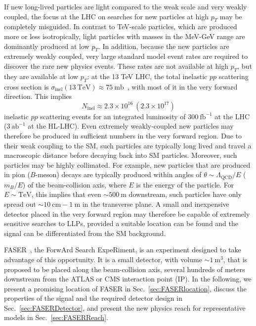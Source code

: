 If new long-lived particles are light compared to the weak scale and very weakly coupled, the focus at the LHC on searches for new particles at high $p_T$ may be completely misguided.  In contrast to TeV-scale particles, which are produced more or less isotropically, light particles with masses in the MeV-GeV range are dominantly produced at low $p_T$.  In addition, because the new particles are extremely weakly coupled, very large standard model event rates are required to discover the rare new physics events.  These rates are not available at high $p_T$, but they are available at low $p_T$: at the 13 TeV LHC, the total inelastic $pp$ scattering cross section is $\sigma_{\text{inel}}(13~\text{TeV}) \approx 75~\text{mb}$~\cite{Aaboud:2016mmw, VanHaevermaet:2016gnh}, with most of it in the very forward direction. This implies
\begin{equation}
N_{\text{inel}} \approx 2.3 \times 10^{16} \ (2.3 \times 10^{17})
\label{eq:ppcollisions}
\end{equation}
inelastic $pp$ scattering events for an integrated luminosity of $300~\text{fb}^{-1}$ at the LHC ($3~\text{ab}^{-1}$ at the HL-LHC).  Even extremely weakly-coupled new particles may therefore be produced in sufficient numbers in the very forward region.  Due to their weak coupling to the SM, such particles are typically long lived and travel a macroscopic distance before decaying back into SM particles.  Moreover, such particles may be highly collimated.  For example, new particles that are produced in pion ($B$-meson) decays are typically produced within angles of $\theta \sim \Lambda_{\text{QCD}} / E$ ($m_B / E$) of the beam-collision axis, where $E$ is the energy of the particle.  For $E \sim \text{TeV}$, this implies that even $\sim 500~\text{m}$ downstream, such particles have only spread out $\sim 10~\text{cm} - 1~\text{m}$ in the transverse plane.  A small and inexpensive detector placed in the very forward region may therefore be capable of extremely sensitive searches to LLPs, provided a suitable location can be found and the signal can be differentiated from the SM background. 

FASER~\cite{Feng:2017uoz,Feng:2017vli,Kling:2018wct}, the ForwArd Search ExpeRiment, is an experiment designed to take advantage of this opportunity.  It is a small detector, with volume $\sim 1~\text{m}^3$, that is proposed to be placed along the beam-collision axis, several hundreds of meters downstream from the ATLAS or CMS interaction point (IP). In the following, we present a promising location of FASER in Sec.~\ref{sec:FASERlocation}, discuss the properties of the signal and the required detector design in Sec.~\ref{sec:FASERDetector}, and present the new physics reach for representative models in Sec.~\ref{sec:FASERReach}. 

